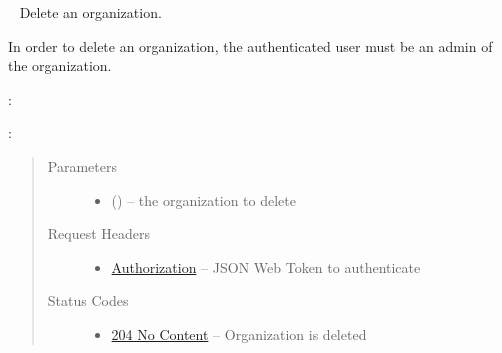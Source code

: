 \documentclass[letterpaper,10pt,english]{sphinxmanual}
\begin{document}
\begin{fulllineitems}
\label{\detokenize{resources/organization:delete--organizations-(organization_id)}}~
Delete an organization.

In order to delete an organization, the authenticated user must be an
admin of the organization.

:

\begin{sphinxVerbatim}[commandchars=\\\{\}]
  
 
 
\end{sphinxVerbatim}

:

\begin{sphinxVerbatim}[commandchars=\\\{\}]
  
\end{sphinxVerbatim}
\begin{quote}\begin{description}
\item[{Parameters}] \leavevmode\begin{itemize}
\item {} 
 () -- the organization to delete

\end{itemize}

\item[{Request Headers}] \leavevmode\begin{itemize}
\item {} 
\href{http://tools.ietf.org/html/rfc7235\#section-4.2}{Authorization} -- JSON Web Token to authenticate

\end{itemize}

\item[{Status Codes}] \leavevmode\begin{itemize}
\item {} 
\href{http://www.w3.org/Protocols/rfc2616/rfc2616-sec10.html\#sec10.2.5}{204 No Content} -- Organization is deleted


\end{itemize}
\end{description}
\end{quote}
\end{fulllineitems}
\end{document}
